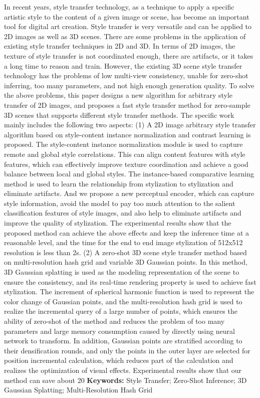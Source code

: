 \cleardoublepage
{}
In recent years, style transfer technology, as a technique to apply a specific artistic style to the content of a given image or scene, has become an important tool for digital art creation. Style transfer is very versatile and can be applied to 2D images as well as 3D scenes. There are some problems in the application of existing style transfer techniques in 2D and 3D. In terms of 2D images, the texture of style transfer is not coordinated enough, there are artifacts, or it takes a long time to reason and train. However, the existing 3D scene style transfer technology has the problems of low multi-view consistency, unable for zero-shot inferring, too many parameters, and not high enough generation quality. To solve the above problems, this paper designs a new algorithm for arbitrary style transfer of 2D images, and proposes a fast style transfer method for zero-sample 3D scenes that supports different style transfer methods. The specific work mainly includes the following two aspects:
\newline \indent(1) A 2D image arbitrary style transfer algorithm based on style-content instance normalization and contrast learning is proposed. The style-content instance normalization module is used to capture remote and global style correlations. This can align content features with style features, which can effectively improve texture coordination and achieve a good balance between local and global styles. The instance-based comparative learning method is used to learn the relationship from stylization to stylization and eliminate artifacts. And we propose a new perceptual encoder, which can capture style information, avoid the model to pay too much attention to the salient classification features of style images, and also help to eliminate artifacts and improve the quality of stylization. The experimental results show that the proposed method can achieve the above effects and keep the inference time at a reasonable level, and the time for the end to end image stylization of 512x512 resolution is less than 2s.
\newline \indent(2) A zero-shot 3D scene style transfer method based on multi-resolution hash grid and variable 3D Gaussian points. In this method, 3D Gaussian splatting is used as the modeling representation of the scene to ensure the consistency, and its real-time rendering property is used to achieve fast stylization. The increment of spherical harmonic function is used to represent the color change of Gaussian points, and the multi-resolution hash grid is used to realize the incremental query of a large number of points, which ensures the ability of zero-shot of the method and reduces the problem of too many parameters and large memory consumption caused by directly using neural network to transform. In addition, Gaussian points are stratified according to their densification rounds, and only the points in the outer layer are selected for position incremental calculation, which reduces part of the calculation and realizes the optimization of visual effects. Experimental results show that our method can save about 20%
\newline
{\textbf{Keywords:}} 
Style Transfer;  Zero-Shot Inference; 3D Gaussian Splatting; Multi-Resolution Hash Grid
